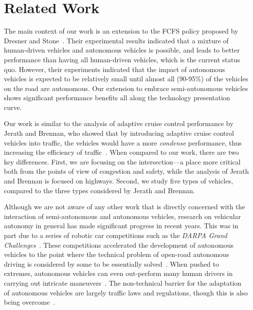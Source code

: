 \section{Related Work}
\label{sec:related}

The main context of our work is an extension to the FCFS policy
proposed by Dresner and Stone~\cite{bib:Dresner08Multiagent}. Their
experimental results indicated that a mixture of human-driven vehicles
and autonomous vehicles is possible, and leads to better performance
than having all human-driven vehicles, which is the current status
quo.  However, their experiments indicated that the impact of
autonomous vehicles is expected to be relatively small until almost
all (90-95\%) of the vehicles on the road are autonomous.  Our
extension to embrace semi-autonomous vehicles shows significant
performance benefits all along the technology presentation curve.

Our work is similar to the analysis of adaptive cruise control
performance by Jerath and Brennan, who showed that by introducing
adaptive cruise control vehicles into traffic, the vehicles would have
a more \textit{condense} performance, thus increasing the efficiency
of traffic~\cite{bib:Jerath10adaptive}.  When compared to our work,
there are two key differences.  First, we are focusing on the
intersection---a place more critical both from the points of view of
congestion and safety, while the analysis of Jerath and Brennan is
focused on highways.  Second, we study five types of vehicles,
compared to the three types considered by Jerath and Brennan.

Although we are not aware of any other work that is directly concerned
with the interaction of semi-autonomous and autonomous vehicles,
research on vehicular autonomy in general has made significant
progress in recent years.  This was in part due to a series of robotic
car competitions such as the \emph{DARPA Grand
Challenges}~\cite{DARPAGrandChallenge}.  These competitions
accelerated the development of autonomous vehicles to the point where
the technical problem of open-road autonomous driving is considered by
some to be essentially solved~\cite{bib:Dresner08Multiagent}.  When
pushed to extremes, autonomous vehicles can even out-perform many
human drivers in carrying out intricate
maneuvers~\cite{Squatriglia2010}. The non-technical barrier for the
adaptation of autonomous vehicles are largely traffic laws and
regulations, though this is also being
overcome~\cite{calo2011-nevada}.

